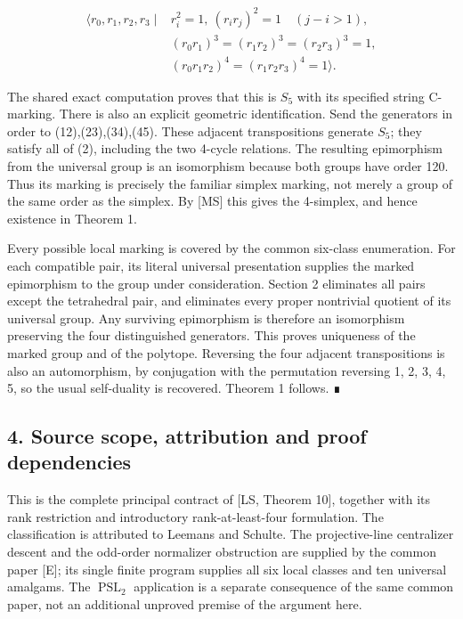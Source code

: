 \documentclass[
  11pt,
  a4paper,
]{article}
\begin{document}
\[
\begin{split}
\langle r_0, r_1, r_2, r_3\mid {}&r_i^2=1,\ (r_ir_j)^2=1\quad(j-i>1),\\
 &(r_0r_1)^3=(r_1r_2)^3=(r_2r_3)^3=1,\\
 &(r_0r_1r_2)^4=(r_1r_2r_3)^4=1\rangle.
\end{split}
\tag{2}
\]

The shared exact computation proves that this is \(S_5\) with its
specified string C-marking. There is also an explicit geometric
identification. Send the generators in order to (12),(23),(34),(45).
These adjacent transpositions generate \(S_5\); they satisfy all of (2),
including the two 4-cycle relations. The resulting epimorphism from the
universal group is an isomorphism because both groups have order 120.
Thus its marking is precisely the familiar simplex marking, not merely a
group of the same order as the simplex. By {[}MS{]} this gives the
4-simplex, and hence existence in Theorem 1.

Every possible local marking is covered by the common six-class
enumeration. For each compatible pair, its literal universal
presentation supplies the marked epimorphism to the group under
consideration. Section 2 eliminates all pairs except the tetrahedral
pair, and eliminates every proper nontrivial quotient of its universal
group. Any surviving epimorphism is therefore an isomorphism preserving
the four distinguished generators. This proves uniqueness of the marked
group and of the polytope. Reversing the four adjacent transpositions is
also an automorphism, by conjugation with the permutation reversing 1,
2, 3, 4, 5, so the usual self-duality is recovered. Theorem 1 follows. ∎

\subsection{4. Source scope, attribution and proof
dependencies}\label{source-scope-attribution-and-proof-dependencies}

This is the complete principal contract of {[}LS, Theorem 10{]},
together with its rank restriction and introductory rank-at-least-four
formulation. The classification is attributed to Leemans and Schulte.
The projective-line centralizer descent and the odd-order normalizer
obstruction are supplied by the common paper {[}E{]}; its single finite
program supplies all six local classes and ten universal amalgams. The
\(\operatorname{PSL}_2\) application is a separate consequence of the
same common paper, not an additional unproved premise of the argument
here.
\end{document}
